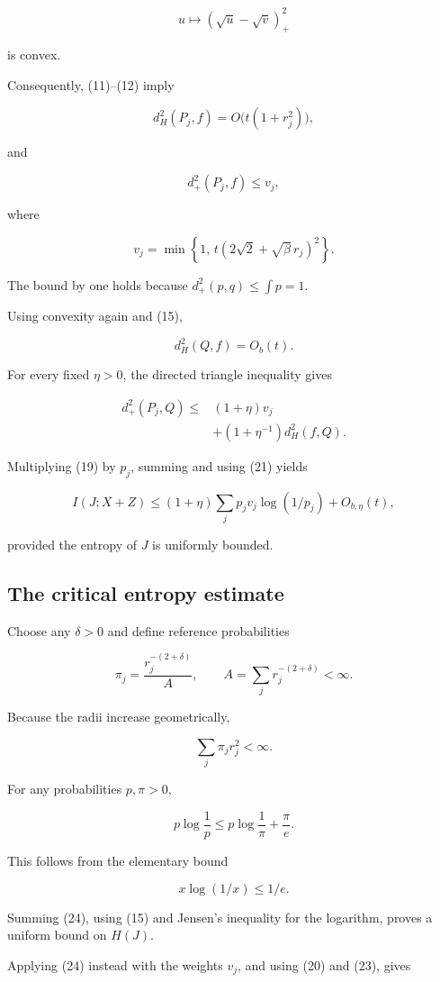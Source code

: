\documentclass[11pt]{article}
\begin{document}
\[
u\mapsto(\sqrt u-\sqrt v)_+^2
\]

is convex.

Consequently, (11)--(12) imply

\[
d_H^2(P_j,f)=O\bigl(t(1+r_j^2)\bigr),
\]

and

\[
d_+^2(P_j,f)\leq v_j,
\]

where

\[
v_j=
\min\left\{
1,\,
t(2\sqrt2+\sqrt\beta\,r_j)^2
\right\}.
\tag{20}
\]

The bound by one holds because \(d_+^2(p,q)\leq\int p=1\).

Using convexity again and (15),

\[
d_H^2(Q,f)=O_b(t).
\tag{21}
\]

For every fixed \(\eta>0\), the directed triangle inequality gives

\[
\begin{aligned}
d_+^2(P_j,Q)
\leq{}&(1+\eta)v_j\\
&+(1+\eta^{-1})d_H^2(f,Q).
\end{aligned}
\]

Multiplying (19) by \(p_j\), summing and using (21) yields

\[
I(J;X+Z)
\leq
(1+\eta)
\sum_jp_jv_j\log(1/p_j)
+O_{b,\eta}(t),
\tag{22}
\]

provided the entropy of \(J\) is uniformly bounded.

\subsection{The critical entropy estimate}

Choose any \(\delta>0\) and define reference probabilities

\[
\pi_j=\frac{r_j^{-(2+\delta)}}{A},
\qquad
A=\sum_jr_j^{-(2+\delta)}<\infty.
\]

Because the radii increase geometrically,

\[
\sum_j\pi_jr_j^2<\infty.
\tag{23}
\]

For any probabilities \(p,\pi>0\),

\[
p\log\frac1p
\leq
p\log\frac1\pi+\frac{\pi}{e}.
\tag{24}
\]

This follows from the elementary bound

\[
x\log(1/x)\leq1/e.
\]

Summing (24), using (15) and Jensen's inequality for the logarithm, proves a uniform bound on \(H(J)\).

Applying (24) instead with the weights \(v_j\), and using (20) and (23), gives
\end{document}
